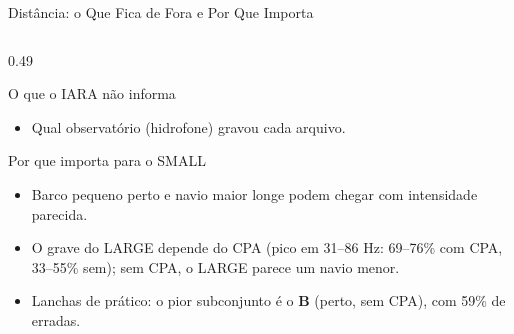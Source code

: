 \documentclass[aspectratio=169]{beamer}
\begin{document}
\begin{frame}{Distância: o Que Fica de Fora e Por Que Importa}
\begin{columns}[T]
\begin{column}{0.49\textwidth}
\begin{block}{\small O que o IARA não informa}
\begin{itemize}
                    \item Qual observatório (hidrofone) gravou cada arquivo.
                \end{itemize}
            \end{block}
            \begin{alertblock}{\small Por que importa para o SMALL}
                \scriptsize
                \begin{itemize}
                    \setlength{\itemsep}{1pt}
                    \item Barco pequeno perto e navio maior longe podem chegar com intensidade parecida.
                    \item O grave do LARGE depende do CPA (pico em 31--86 Hz: 69--76\% com CPA, 33--55\% sem); sem CPA, o LARGE parece um navio menor.
                    \item Lanchas de prático: o pior subconjunto é o \textbf{B} (perto, sem CPA), com 59\% de erradas.
                \end{itemize}
            \end{alertblock}
        \end{column}
    \end{columns}
\end{frame}
\end{document}
